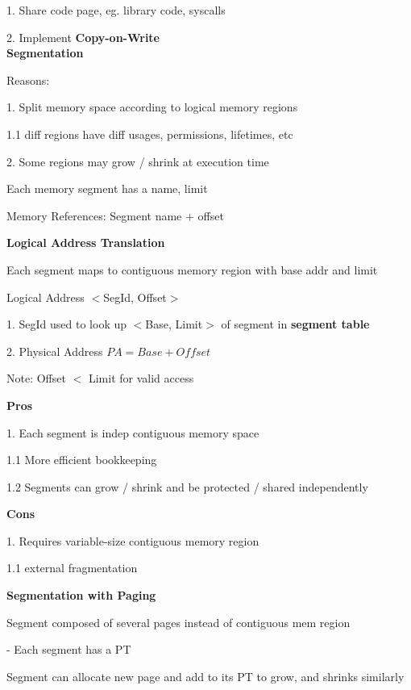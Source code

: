 \documentclass[10pt, a4paper]{article}
\newcommand{\highlight}[1]{{\color{red}\textbf{#1}}}
\newcommand{\blue}[1]{{\color{MidnightBlue}#1}}
\newcommand{\red}[1]{{\color{red}#1}}
\newcommand{\green}[1]{{\color{ForestGreen}#1}}
\newcommand{\tab}[0]{\hspace*{2mm}}
\begin{document}
\begin{multicols*}{3}
		1. Share code page, eg. library code, syscalls

		2. Implement \highlight{Copy-on-Write}\\

		\textbf{Segmentation}

		Reasons:

		1. Split memory space according to \red{logical memory regions}

		\tab{} 1.1 diff regions have diff usages, permissions, lifetimes, etc

		2. Some regions may \green{grow} / \red{shrink} at execution time

		Each memory segment has a \red{name}, \green{limit}

		Memory References: \red{Segment name} $+$ \green{offset}

		\textbf{Logical Address Translation}

		Each segment maps to \red{contiguous} memory region with \red{base addr} and \green{limit}

		Logical Address $<$\green{SegId}, \blue{Offset}$>$

		1. SegId used to look up $<$Base, Limit$>$ of segment in \highlight{segment table}

		2. Physical Address $PA = Base + Offset$

		\red{Note}: Offset $<$ Limit for valid access

		\textbf{\green{Pros}}

		1. Each segment is indep contiguous memory space

		\tab{} 1.1 More efficient bookkeeping

		\tab{} 1.2 Segments can grow / shrink and be protected / shared independently

		\highlight{Cons}

		1. Requires \red{variable-size contiguous} memory region 
		
		\tab{} 1.1 external fragmentation

		\textbf{Segmentation with Paging}

		Segment composed of several pages instead of contiguous mem region

		\tab{} - Each segment has a PT 

		Segment can allocate new page and add to its PT to grow, and shrinks similarly


\end{multicols*}
\end{document}
